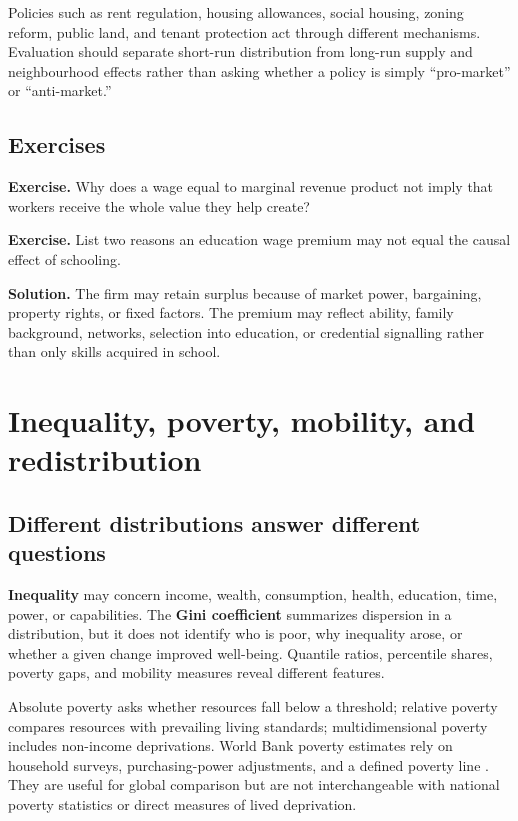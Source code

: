 \documentclass[11pt,oneside,openany]{book}
\newcommand{\term}[1]{\textbf{#1}\index{#1}}
\newcommand{\exercise}[1]{\textbf{Exercise.} #1}
\newcommand{\solution}[1]{\textbf{Solution.} #1}
\begin{document}
Policies such as rent regulation, housing allowances, social housing, zoning reform, public land, and tenant protection act through different mechanisms. Evaluation should separate short-run distribution from long-run supply and neighbourhood effects rather than asking whether a policy is simply ``pro-market'' or ``anti-market.''

\section{Exercises}

\exercise{Why does a wage equal to marginal revenue product not imply that workers receive the whole value they help create?}

\exercise{List two reasons an education wage premium may not equal the causal effect of schooling.}

\solution{The firm may retain surplus because of market power, bargaining, property rights, or fixed factors. The premium may reflect ability, family background, networks, selection into education, or credential signalling rather than only skills acquired in school.}

\chapter{Inequality, poverty, mobility, and redistribution}
\label{ch:inequality}

\section{Different distributions answer different questions}

\term{Inequality} may concern income, wealth, consumption, health, education, time, power, or capabilities. The \term{Gini coefficient} summarizes dispersion in a distribution, but it does not identify who is poor, why inequality arose, or whether a given change improved well-being. Quantile ratios, percentile shares, poverty gaps, and mobility measures reveal different features.

Absolute poverty asks whether resources fall below a threshold; relative poverty compares resources with prevailing living standards; multidimensional poverty includes non-income deprivations. World Bank poverty estimates rely on household surveys, purchasing-power adjustments, and a defined poverty line \cite{wdi}. They are useful for global comparison but are not interchangeable with national poverty statistics or direct measures of lived deprivation.
\end{document}
